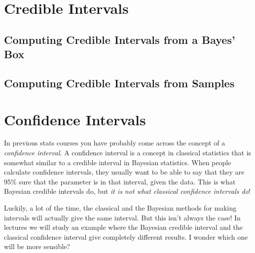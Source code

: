 \section{Credible Intervals}

\subsection{Computing Credible Intervals from a Bayes' Box}


\subsection{Computing Credible Intervals from Samples}


\section{Confidence Intervals}
In previous stats courses you have probably come across the concept of a
{\it confidence interval}. A confidence interval is a concept in classical
statistics that is somewhat similar to a credible interval in Bayesian statistics.
When people calculate confidence intervals, they usually want to be
able to say that they are 95\% sure that the parameter is in that interval,
given the data. This is what Bayesian credible intervals do, but {\it it is not
what classical confidence intervals do}!

Luckily, a lot of the time, the classical and the Bayesian methods for making
intervals will actually give the same interval. But this isn't always the case!
In lectures we will study an example where the Bayesian credible interval and
the classical confidence interval give completely different results. I wonder
which one will be more sensible?
